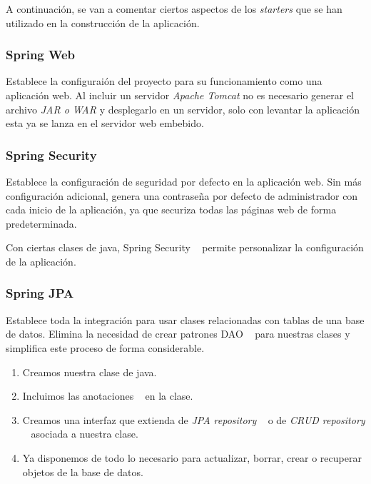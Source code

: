 A continuación, se van a comentar ciertos aspectos de los \textit{starters} que se han utilizado en la construcción de la aplicación.

\subsubsection{Spring Web}

Establece la configuraión del proyecto para su funcionamiento como una aplicación web. Al incluir un servidor \textit{Apache Tomcat} no es necesario generar el archivo \textit{JAR o WAR} y desplegarlo en un servidor, solo con levantar la aplicación esta ya se lanza en el servidor web embebido.
 

\subsubsection{Spring Security}

Establece la configuración de seguridad por defecto en la aplicación web. Sin más configuración adicional, genera una contraseña por defecto de administrador con cada inicio de la aplicación, ya que securiza todas las páginas web de forma predeterminada.

Con ciertas clases de java, Spring Security ~\cite{web:springSecurity} permite personalizar la configuración de la aplicación.

\subsubsection{Spring JPA}

Establece toda la integración para usar clases relacionadas con tablas de una base de datos. Elimina la necesidad de crear patrones DAO ~\cite{web:dao} para nuestras clases y simplifica este proceso de forma considerable.

\begin{enumerate}
	\item Creamos nuestra clase de java.
	\item Incluimos las anotaciones ~\cite{web:anotacionesJPA} en la clase.
	\item Creamos una interfaz que extienda de \textit{JPA repository}  ~\cite{web:springCJPArepo} o de \textit{CRUD repository} ~\cite{web:springCRUDrepo} asociada a nuestra clase.
	\item Ya disponemos de todo lo necesario para actualizar, borrar, crear o recuperar objetos de la base de datos.
\end{enumerate}


